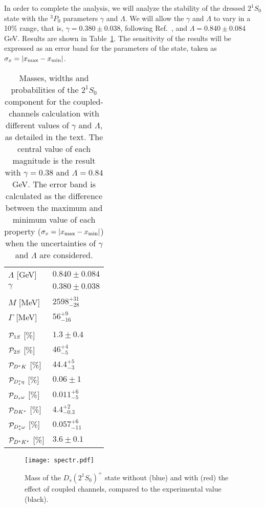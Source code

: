 \documentclass[aps, prd, floatfix, twocolumn, superscriptaddress, nofootinbib]{revtex4-1}
\begin{document}
In order to complete the analysis, we will analyze the stability of the dressed $2^1S_0$ state with the $^3P_0$ parameters $\gamma$ and $\Lambda$. We will allow the $\gamma$ and $\Lambda$ to vary in a 10\% range, that is, $\gamma=0.380\pm0.038$, following Ref.~\cite{Segovia:2012cd}, and $\Lambda=0.840\pm0.084$ GeV. Results are shown in Table~\ref{tab:results}. The sensitivity of the results will be expressed as an error band for the parameters of the state, taken as $\sigma_x=|x_{\rm max}-x_{\rm min}|$.
 


\begin{table}[h!]
 \begin{center}
 \begin{tabular}{ll}
 \hline\hline
$\Lambda$ [GeV] & $0.840\pm0.084$ \\
$\gamma$ & $0.380\pm0.038$ \\
&\\
$M$ [MeV] & $2598^{+31}_{-28}$ \\
$\Gamma$ [MeV] & $56^{+9}_{-16}$ \\
&\\
${\cal P}_{1S}$ [\%] & $1.3\pm0.4$\\
${\cal P}_{2S}$ [\%] & $46^{+4}_{-5}$\\
${\cal P}_{D^*K}$ [\%] & $44.4^{+5}_{-3}$\\
${\cal P}_{D_s^*\eta}$ [\%] & $0.06\pm1$\\
${\cal P}_{D_s\omega}$ [\%] & $0.011^{+6}_{-5}$\\
${\cal P}_{DK^*}$ [\%] & $4.4^{+2}_{-0.3}$\\
${\cal P}_{D_s^*\omega}$ [\%] & $0.057^{+6}_{-11}$\\
${\cal P}_{D^*K^*}$ [\%] & $3.6\pm0.1$\\
   \hline\hline
 \end{tabular}
 \caption{\label{tab:results} Masses, widths and probabilities of the $2^1S_0$ component for the coupled-channels calculation with different values of $\gamma$ and $\Lambda$, as detailed in the text. The central value of each magnitude is the result with $\gamma=0.38$ and $\Lambda=0.84$ GeV. The error band is calculated as the difference between the maximum and minimum value of each property ($\sigma_x=|x_{\rm max}-x_{\rm min}|$) when the uncertainties of $\gamma$ and $\Lambda$ are considered.}
\end{center}
\end{table}

\begin{figure}[!t]
\centering
\texttt{[image: spectr.pdf]}
%
\caption{\label{fig:masses} Mass of the $D_s(2^1S_0)^+$ state without (blue) and with (red) the effect of coupled channels, compared to the experimental value (black).}
\end{figure}
\end{document}
